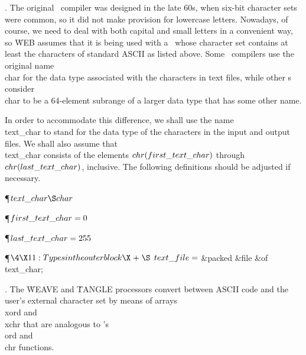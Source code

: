 . The original \PASCAL\ compiler was designed in the late 60s, when six-bit
character sets were common, so it did not make provision for lowercase
letters. Nowadays, of course, we need to deal with both capital and small
letters in a convenient way, so \.{WEB} assumes that it is being used
with a \PASCAL\ whose character set contains at least the characters of
standard ASCII as listed above. Some \PASCAL\ compilers use the original
name \\{char} for the data type associated with the characters in text files,
while other \PASCAL s consider \\{char} to be a 64-element subrange of a larger
data type that has some other name.

In order to accommodate this difference, we shall use the name \\{text\_char}
to stand for the data type of the characters in the input and output
files.  We shall also assume that \\{text\_char} consists of the elements
$\\{chr}(\\{first\_text\_char})$ through $\\{chr}(\\{last\_text\_char})$,
inclusive. The
following definitions should be adjusted if necessary.

\Y\P\D {}$\\{text\_char}\S\\{char}$\par
\P\D {}$\\{first\_text\_char}=0$\par
\P\D {}$\\{last\_text\_char}=255$\par
\Y\P$\4\X11:Types in the outer block\X\mathrel{+}\S$\6
$\\{text\_file}=$\1\5
\&{packed} \&{file} \1\&{of}\5
\\{text\_char};\2\2\par
\fi

. The \.{WEAVE} and \.{TANGLE} processors convert between ASCII code and
the user's external character set by means of arrays \\{xord} and \\{xchr}
that are analogous to \PASCAL's \\{ord} and \\{chr} functions.

